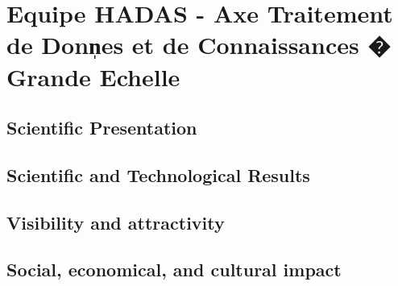 
\section{Equipe HADAS - Axe Traitement de Donn̩es et de Connaissances �  Grande Echelle} %
\label{sec:hadas}

\subsection{Scientific Presentation} %
\label{sub:hadas_scientific_presentation}




\subsection{Scientific and Technological Results} %
\label{sub:hadas_scientific_and_technological_results}




\subsection{Visibility and attractivity} %
\label{sub:hadas_visibility_and_attractivity}




\subsection{Social, economical, and cultural impact} %
\label{sub:hadas_social_economical_and_cultural_impact}

